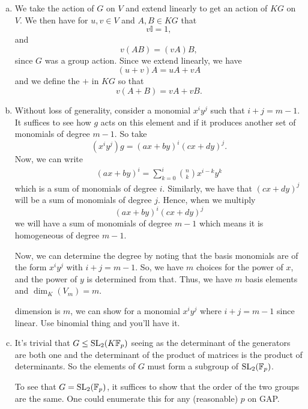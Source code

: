 \documentclass[leqno]{article}
\begin{document}
\begin{enumerate}[(a)]
    \item We take the action of $G$ on $V$ and extend linearly to get an action of $KG$ on $V$.  We then have for $u,v\in V$ and $A,B\in KG$ that
    \[
    v \mathbb{I} = 1,
    \]
    and
    \[
    v(AB)=(vA)B,
    \]
    since $G$ was a group action. Since we extend linearly, we have
    \[
    (u+v)A=uA+vA
    \]
    and we define the $+$ in $KG$ so that
    \[
    v(A+B)=vA+vB.
    \]
    \item Without loss of generality, consider a monomial $x^iy^j$ such that $i+j=m-1$.  It suffices to see how $g$ acts on this element and if it produces another set of monomials of degree $m-1$.  So take
    \[
    (x^iy^j)g=(ax+by)^i(cx+dy)^j.
    \]
    Now, we can write
    \begin{align*}
        (ax+by)^i =\sum_{k=0}^i \binom{n}{k} x^{i-k}y^k
    \end{align*}
    which is a sum of monomials of degree $i$. Similarly, we have that $(cx+dy)^j$ will be a sum of monomials of degree $j$.  Hence, when we multiply
    \[
    (ax+by)^i(cx+dy)^j
    \]
    we will have a sum of monomials of degree $m-1$ which means it is homogeneous of degree $m-1$.  
    
    Now, we can determine the degree by noting that the basis monomials are of the form $x^iy^j$ with $i+j=m-1$.  So, we have $m$ choices for the power of $x$, and the power of $y$ is determined from that. Thus, we have $m$ basis elements and $\dim_K(V_m)=m$.
    
    dimension is $m$, we can show for a monomial $x^i y^j$ where $i+j=m-1$ since linear. Use binomial thing and you'll have it.
    \item It's trivial that $G\leq \mathrm{SL}_2(K\mathbb{F}_p)$ seeing as the determinant of the generators are both one and the determinant of the product of matrices is the product of determinants. So the elements of $G$ must form a subgroup of $\mathrm{SL}_2(\mathbb{F}_p)$.
    
    To see that $G = \mathrm{SL}_2(\mathbb{F}_p)$, it suffices to show that the order of the two groups are the same.  One could enumerate this for any (reasonable) $p$ on \textsf{GAP}.
\end{enumerate}
\end{document}
